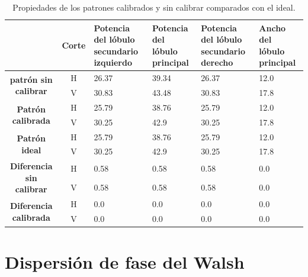 \begin{table}[H]
  \footnotesize
  \centering
  \begin{tabular}{|c|c|p{2cm}|p{2cm}|p{2cm}|p{2cm}|}
    \cline{2-6}
    \multicolumn{1}{c|}{} & \textbf{Corte} & \textbf{Potencia del lóbulo secundario izquierdo} & \textbf{Potencia del lóbulo principal} &
    \textbf{Potencia del lóbulo secundario derecho} & \textbf{Ancho del lóbulo principal} \tabularnewline\hline
    \multirow{2}{*}{\textbf{patrón sin calibrar}} & H & 26.37 & 39.34 & 26.37 & 12.0 \tabularnewline\cline{2-6}
     & V & 30.83 & 43.48 & 30.83 & 17.8 \tabularnewline\hline
    \multirow{2}{*}{\textbf{Patrón calibrada}} & H & 25.79 & 38.76 & 25.79 & 12.0 \tabularnewline\cline{2-6}
     & V & 30.25 & 42.9 & 30.25 & 17.8 \tabularnewline\hline
    \multirow{2}{*}{\textbf{Patrón ideal}} & H & 25.79 & 38.76 & 25.79 & 12.0 \tabularnewline\cline{2-6}
     & V & 30.25 & 42.9 & 30.25 & 17.8 \tabularnewline\hline
    \multirow{2}{*}{\textbf{Diferencia sin calibrar}} & H & 0.58 & 0.58 & 0.58 & 0.0\tabularnewline\cline{2-6}
     & V & 0.58 & 0.58 & 0.58 & 0.0 \tabularnewline\hline
    \multirow{2}{*}{\textbf{Diferencia calibrada}} & H & 0.0 & 0.0 & 0.0 & 0.0 \tabularnewline\cline{2-6}
     & V & 0.0 & 0.0 & 0.0 & 0.0 \tabularnewline\hline
  \end{tabular}
  \caption{Propiedades de los patrones calibrados y sin calibrar comparados con el ideal.}
	  \label{tab:chirpRepErrClassical10degRow}
\end{table}


\section{Dispersión de fase del Walsh}

